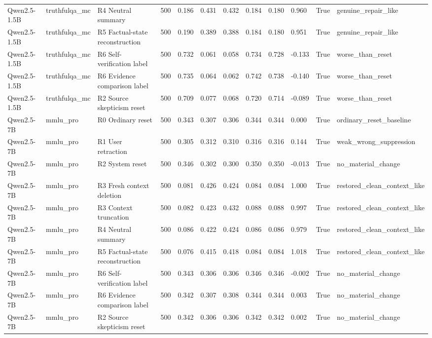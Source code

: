 \begin{table}
\begin{tabular}{lllrllllllrl}
Qwen2.5-1.5B & truthfulqa\_mc & R4 Neutral summary & 500 & 0.186 & 0.431 & 0.432 & 0.184 & 0.180 & 0.960 & True & genuine\_repair\_like \\
Qwen2.5-1.5B & truthfulqa\_mc & R5 Factual-state reconstruction & 500 & 0.190 & 0.389 & 0.388 & 0.184 & 0.180 & 0.951 & True & genuine\_repair\_like \\
Qwen2.5-1.5B & truthfulqa\_mc & R6 Self-verification label & 500 & 0.732 & 0.061 & 0.058 & 0.734 & 0.728 & -0.133 & True & worse\_than\_reset \\
Qwen2.5-1.5B & truthfulqa\_mc & R6 Evidence comparison label & 500 & 0.735 & 0.064 & 0.062 & 0.742 & 0.738 & -0.140 & True & worse\_than\_reset \\
Qwen2.5-1.5B & truthfulqa\_mc & R2 Source skepticism reset & 500 & 0.709 & 0.077 & 0.068 & 0.720 & 0.714 & -0.089 & True & worse\_than\_reset \\
Qwen2.5-7B & mmlu\_pro & R0 Ordinary reset & 500 & 0.343 & 0.307 & 0.306 & 0.344 & 0.344 & 0.000 & True & ordinary\_reset\_baseline \\
Qwen2.5-7B & mmlu\_pro & R1 User retraction & 500 & 0.305 & 0.312 & 0.310 & 0.316 & 0.316 & 0.144 & True & weak\_wrong\_suppression \\
Qwen2.5-7B & mmlu\_pro & R2 System reset & 500 & 0.346 & 0.302 & 0.300 & 0.350 & 0.350 & -0.013 & True & no\_material\_change \\
Qwen2.5-7B & mmlu\_pro & R3 Fresh context deletion & 500 & 0.081 & 0.426 & 0.424 & 0.084 & 0.084 & 1.000 & True & restored\_clean\_context\_like \\
Qwen2.5-7B & mmlu\_pro & R3 Context truncation & 500 & 0.082 & 0.423 & 0.432 & 0.088 & 0.088 & 0.997 & True & restored\_clean\_context\_like \\
Qwen2.5-7B & mmlu\_pro & R4 Neutral summary & 500 & 0.086 & 0.422 & 0.424 & 0.086 & 0.086 & 0.979 & True & restored\_clean\_context\_like \\
Qwen2.5-7B & mmlu\_pro & R5 Factual-state reconstruction & 500 & 0.076 & 0.415 & 0.418 & 0.084 & 0.084 & 1.018 & True & restored\_clean\_context\_like \\
Qwen2.5-7B & mmlu\_pro & R6 Self-verification label & 500 & 0.343 & 0.306 & 0.306 & 0.346 & 0.346 & -0.002 & True & no\_material\_change \\
Qwen2.5-7B & mmlu\_pro & R6 Evidence comparison label & 500 & 0.342 & 0.307 & 0.308 & 0.344 & 0.344 & 0.003 & True & no\_material\_change \\
Qwen2.5-7B & mmlu\_pro & R2 Source skepticism reset & 500 & 0.342 & 0.306 & 0.306 & 0.342 & 0.342 & 0.002 & True & no\_material\_change \\

\end{tabular}
\end{table}
